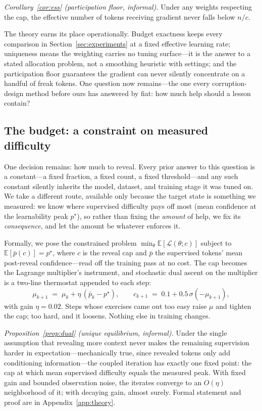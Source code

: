 \documentclass{article} %
\begin{document}
\emph{Corollary~\ref{cor:ess} (participation floor, informal).} Under any weights respecting the cap, the effective number of tokens receiving gradient never falls below $n/c$.

The theory earns its place operationally. Budget exactness keeps every comparison in Section~\ref{sec:experiments} at a fixed effective learning rate; uniqueness means the weighting carries no tuning surface---it is the answer to a stated allocation problem, not a smoothing heuristic with settings; and the participation floor guarantees the gradient can never silently concentrate on a handful of freak tokens. One question now remains---the one every corruption-design method before ours has answered by fiat: how much help should a lesson contain?

\subsection{The budget: a constraint on measured difficulty}
\label{sec:lagrangian}

One decision remains: how much to reveal. Every prior answer to this question is a constant---a fixed fraction, a fixed count, a fixed threshold---and any such constant silently inherits the model, dataset, and training stage it was tuned on. We take a different route, available only because the target state is something we measured: we know where supervised difficulty pays off most (mean confidence at the learnability peak $p^\star$), so rather than fixing the \emph{amount} of help, we fix its \emph{consequence}, and let the amount be whatever enforces it.

Formally, we pose the constrained problem $\min_\theta \mathbb{E}[\mathcal{L}(\theta; c)]$ subject to $\mathbb{E}[\bar p(c)] = p^\star$, where $c$ is the reveal cap and $\bar p$ the supervised tokens' mean post-reveal confidence---read off the training pass at no cost. The cap becomes the Lagrange multiplier's instrument, and stochastic dual ascent on the multiplier is a two-line thermostat appended to each step:
\begin{equation}
\mu_{k+1} \;=\; \mu_k + \eta\,(\bar p_k - p^\star), \qquad
c_{k+1} \;=\; 0.1 + 0.5\,\sigma(-\mu_{k+1}),
\end{equation}
with gain $\eta = 0.02$. Steps whose exercises came out too easy raise $\mu$ and tighten the cap; too hard, and it loosens. Nothing else in training changes.

\emph{Proposition~\ref{prop:dual} (unique equilibrium, informal).} Under the single assumption that revealing more context never makes the remaining supervision harder in expectation---mechanically true, since revealed tokens only add conditioning information---the coupled iteration has exactly one fixed point: the cap at which mean supervised difficulty equals the measured peak. With fixed gain and bounded observation noise, the iterates converge to an $O(\eta)$ neighborhood of it; with decaying gain, almost surely. Formal statement and proof are in Appendix~\ref{app:theory}.
\end{document}
